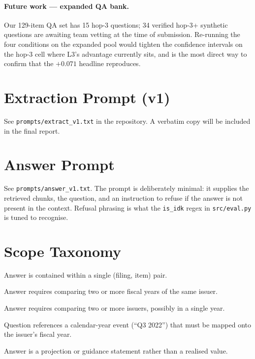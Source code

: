 \documentclass[11pt]{article}
\begin{document}
\paragraph{Future work --- expanded QA bank.}
Our 129-item QA set has 15 hop-3 questions; 34 verified
hop-3+ synthetic questions are awaiting team vetting at the time of
submission. Re-running the four conditions on the expanded pool
would tighten the confidence intervals on the hop-3 cell where L3's
advantage currently sits, and is the most direct way to confirm that
the $+0.071$ headline reproduces.



\appendix

\section{Extraction Prompt (v1)}
\label{app:extract}
See \texttt{prompts/extract\_v1.txt} in the repository. A verbatim
copy will be included in the final report.

\section{Answer Prompt}
\label{app:answer}
See \texttt{prompts/answer\_v1.txt}. The prompt is deliberately
minimal: it supplies the retrieved chunks, the question, and an
instruction to refuse if the answer is not present in the context.
Refusal phrasing is what the \texttt{is\_idk} regex in
\texttt{src/eval.py} is tuned to recognise.

\section{Scope Taxonomy}
\label{app:scope}
\begin{description}
\itemsep 0pt \parskip 0pt
\item[intra] Answer is contained within a single (filing, item) pair.
\item[inter\_year] Answer requires comparing two or more fiscal years
  of the same issuer.
\item[cross\_company] Answer requires comparing two or more issuers,
  possibly in a single year.
\item[fiscal\_vs\_calendar] Question references a calendar-year event
  (``Q3 2022'') that must be mapped onto the issuer's fiscal year.
\item[forward\_looking] Answer is a projection or guidance statement
  rather than a realised value.
\end{description}
\end{document}

